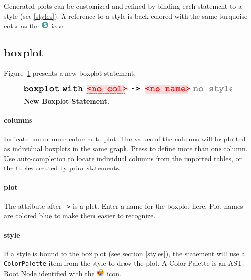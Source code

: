 Generated plots can be customized and refined by binding each statement to a style (see \ref{styles}). A reference to a style is back-colored with the same turquoise color as the  \includegraphics[height=2ex]{figures/style.png} icon.

\subsection{boxplot}
Figure~\ref{fig:NewBoxPlot} presents a new boxplot statement.

\begin{figure}
  \centering
  \includegraphics[width=\figWidthNarrow]{figures/NewBoxplot.pdf}
\caption[New Boxplot Statement.]{\textbf{New Boxplot Statement.}}
\label{fig:NewBoxPlot}
\end{figure}

\paragraph{columns}
Indicate one or more columns to plot. The values of the columns will be plotted as individual boxplots in the same graph. Press \keys{\enter} to define more than one column. Use auto-completion to locate individual columns from the imported tables, or the tables created by prior statements. 

\paragraph{plot}
The attribute after \texttt{->} is a plot. Enter a name for the boxplot here. Plot names are colored blue to make them easier to recognize.

\paragraph{style} \label{ColorPaletteDesc}
If a style is bound to the box plot (see section \ref{styles}),  the statement will use a \texttt{Color\allowbreak{}Palette} item from the style to draw the plot. A Color Palette is an AST Root Node identified with the  \includegraphics[height=2ex]{figures/palette.png} icon. 

